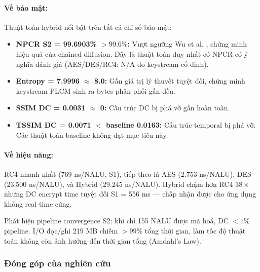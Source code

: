 \paragraph{Về bảo mật:}
Thuật toán hybrid nổi bật trên tất cả chỉ số bảo mật:
\begin{itemize}
  \item \textbf{NPCR S2 = 99.6903\% $> 99.6\%$:} Vượt ngưỡng Wu et al. \cite{wu_npcr},
        chứng minh hiệu quả của chained diffusion. Đây là thuật toán duy nhất
        có NPCR có ý nghĩa đánh giá (AES/DES/RC4: N/A do keystream cố định).
  \item \textbf{Entropy = 7.9996 $\approx$ 8.0:} Gần giá trị lý thuyết tuyệt đối,
        chứng minh keystream PLCM sinh ra bytes phân phối gần đều.
  \item \textbf{SSIM DC = 0.0031 $\approx$ 0:} Cấu trúc DC bị phá vỡ gần hoàn toàn.
  \item \textbf{TSSIM DC = 0.0071 $<$ baseline 0.0163:} Cấu trúc temporal bị phá vỡ.
        Các thuật toán baseline không đạt mục tiêu này.
\end{itemize}

\paragraph{Về hiệu năng:}
RC4 nhanh nhất (769 ns/NALU, S1), tiếp theo là AES (2.753 ns/NALU), DES (23.500 ns/NALU),
và Hybrid (29.245 ns/NALU). Hybrid chậm hơn RC4 $38\times$ nhưng DC encrypt time
tuyệt đối S1 = 556 ms --- chấp nhận được cho ứng dụng không real-time cứng.

Phát hiện pipeline convergence S2: khi chỉ 155 NALU được mã hoá, DC $< 1\%$ pipeline.
I/O đọc/ghi 219 MB chiếm $> 99\%$ tổng thời gian, làm tốc độ thuật toán không
còn ảnh hưởng đến thời gian tổng (Amdahl's Law).

\subsubsection{Đóng góp của nghiên cứu}

